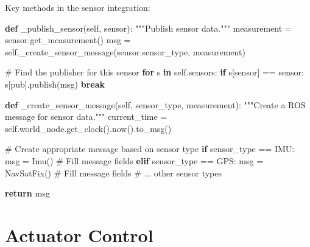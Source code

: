\documentclass[
  letterpaper,
  DIV=11,
  numbers=noendperiod]{scrreprt}
\newenvironment{Shaded}{\begin{snugshade}}{\end{snugshade}}
\newcommand{\CommentTok}[1]{\textcolor[rgb]{0.37,0.37,0.37}{#1}}
\newcommand{\ControlFlowTok}[1]{\textcolor[rgb]{0.00,0.23,0.31}{\textbf{#1}}}
\newcommand{\KeywordTok}[1]{\textcolor[rgb]{0.00,0.23,0.31}{\textbf{#1}}}
\newcommand{\NormalTok}[1]{\textcolor[rgb]{0.00,0.23,0.31}{#1}}
\newcommand{\OperatorTok}[1]{\textcolor[rgb]{0.37,0.37,0.37}{#1}}
\newcommand{\StringTok}[1]{\textcolor[rgb]{0.13,0.47,0.30}{#1}}
\newcommand{\VariableTok}[1]{\textcolor[rgb]{0.07,0.07,0.07}{#1}}
\begin{document}
Key methods in the sensor integration:

\begin{Shaded}
\begin{Highlighting}[]
\KeywordTok{def}\NormalTok{ \_publish\_sensor(}\VariableTok{self}\NormalTok{, sensor):}
    \CommentTok{"""Publish sensor data."""}
\NormalTok{    measurement }\OperatorTok{=}\NormalTok{ sensor.get\_measurement()}
\NormalTok{    msg }\OperatorTok{=} \VariableTok{self}\NormalTok{.\_create\_sensor\_message(sensor.sensor\_type, measurement)}
    
    \CommentTok{\# Find the publisher for this sensor}
    \ControlFlowTok{for}\NormalTok{ s }\KeywordTok{in} \VariableTok{self}\NormalTok{.sensors:}
        \ControlFlowTok{if}\NormalTok{ s[}\StringTok{\textquotesingle{}sensor\textquotesingle{}}\NormalTok{] }\OperatorTok{==}\NormalTok{ sensor:}
\NormalTok{            s[}\StringTok{\textquotesingle{}pub\textquotesingle{}}\NormalTok{].publish(msg)}
            \ControlFlowTok{break}
\end{Highlighting}
\end{Shaded}

\begin{Shaded}
\begin{Highlighting}[]
\KeywordTok{def}\NormalTok{ \_create\_sensor\_message(}\VariableTok{self}\NormalTok{, sensor\_type, measurement):}
    \CommentTok{"""Create a ROS message for sensor data."""}
\NormalTok{    current\_time }\OperatorTok{=} \VariableTok{self}\NormalTok{.world\_node.get\_clock().now().to\_msg()}
    
    \CommentTok{\# Create appropriate message based on sensor type}
    \ControlFlowTok{if}\NormalTok{ sensor\_type }\OperatorTok{==} \StringTok{\textquotesingle{}IMU\textquotesingle{}}\NormalTok{:}
\NormalTok{        msg }\OperatorTok{=}\NormalTok{ Imu()}
        \CommentTok{\# Fill message fields}
    \ControlFlowTok{elif}\NormalTok{ sensor\_type }\OperatorTok{==} \StringTok{\textquotesingle{}GPS\textquotesingle{}}\NormalTok{:}
\NormalTok{        msg }\OperatorTok{=}\NormalTok{ NavSatFix()}
        \CommentTok{\# Fill message fields}
    \CommentTok{\# ... other sensor types}
    
    \ControlFlowTok{return}\NormalTok{ msg}
\end{Highlighting}
\end{Shaded}

\section*{Actuator Control}\label{actuator-control}
\end{document}
